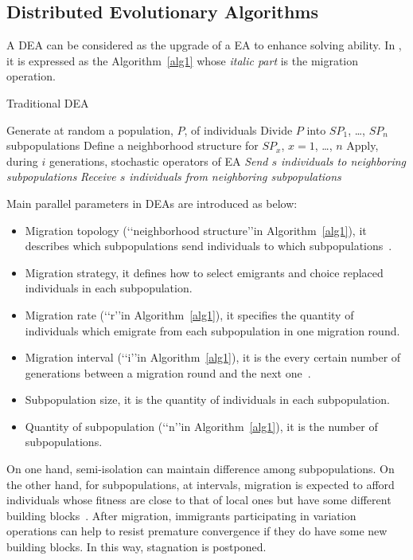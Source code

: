 \documentclass[journal,onecolumn]{IEEEtran}
\begin{document}
\subsection{Distributed Evolutionary Algorithms}
A DEA can be considered as the upgrade of a EA to enhance solving ability.
In \cite{herrera1999hierarchical}, it is expressed as the Algorithm~\ref{alg1} whose \emph{italic part} is the migration operation.
\begin{algorithm}
\caption{Traditional DEA}
\label{alg1}
\begin{algorithmic}[1]
\STATE Generate at random a population, $P$, of individuals
\STATE Divide $P$ into $SP_1$, \ldots, $SP_n$ subpopulations
\STATE Define a neighborhood structure for $SP_x$, $x=1$, \ldots, $n$
\REPEAT [Execute in parallel the next steps for $SP_x$, $x=1$, \ldots, $n$]
  \STATE Apply, during $i$ generations, stochastic operators of EA
  \STATE \emph{Send $s$ individuals to neighboring subpopulations}
  \STATE \emph{Receive $s$ individuals from neighboring subpopulations}
\end{algorithmic}
\end{algorithm}
Main parallel parameters in DEAs are introduced as below:
\begin{itemize}
  \item
  Migration topology (\lq\lq neighborhood structure\rq\rq  in Algorithm~\ref{alg1}), it describes which subpopulations send individuals to which subpopulations~\cite{skolicki2005influence}.
  \item
  Migration strategy, it defines how to select emigrants and choice replaced individuals in each subpopulation.
  \item
  Migration rate (\lq\lq r\rq\rq  in Algorithm~\ref{alg1}), it specifies the quantity of individuals which emigrate from each subpopulation in one migration round.
  \item
  Migration interval (\lq\lq i\rq\rq  in Algorithm~\ref{alg1}), it is the every certain number of generations between a migration round and the next one~\cite{skolicki2005influence}.
  \item
  Subpopulation size, it is the quantity of individuals in each subpopulation.
  \item
  Quantity of subpopulation (\lq\lq n\rq\rq  in Algorithm~\ref{alg1}), it is the number of subpopulations.
\end{itemize}
\par
On one hand, semi-isolation can maintain difference among subpopulations.
On the other hand, for subpopulations, at intervals, migration is expected to afford individuals whose fitness are close to that of local ones but have some different building blocks~\cite{cohoon1987punctuated}.
After migration, immigrants participating in variation operations can help to resist premature convergence if they do have some new building blocks.
In this way, stagnation is postponed.
\end{document}
